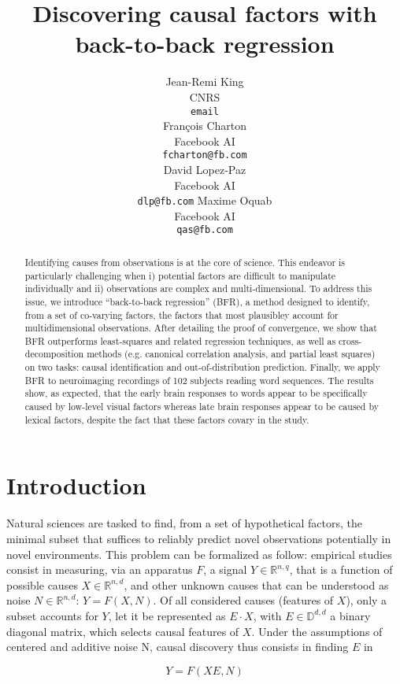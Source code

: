 \documentclass{article}
\title{Discovering causal factors with back-to-back regression}
\author{%
  Jean-Remi King\\
  CNRS\\
  \texttt{email} \\
  \And
  Fran\c{c}ois Charton\\
  Facebook AI\\
  \texttt{fcharton@fb.com}\\
  \And
  David Lopez-Paz\\
  Facebook AI\\
  \texttt{dlp@fb.com}
  \And
  Maxime Oquab\\
  Facebook AI\\
  \texttt{qas@fb.com}
}
\begin{document}
\maketitle

\begin{abstract}
Identifying causes from observations is at the core of science. This endeavor
is particularly challenging when i) potential factors are difficult to
manipulate individually and ii) observations are complex and multi-dimensional.
To address this issue, we introduce ``back-to-back regression'' (BFR), a
method designed to identify, from a set of co-varying factors, the factors
that most plausibley account for multidimensional observations. After detailing
the proof of convergence, we show that BFR outperforms least-squares and related
regression techniques, as well as cross-decomposition methods (e.g. canonical
correlation analysis, and partial least squares) on two tasks: causal
identification and out-of-distribution prediction. Finally, we apply BFR to
neuroimaging recordings of 102 subjects reading word sequences. The results
show, as expected, that the early brain responses to words appear to be
specifically caused by low-level visual factors whereas late brain responses
appear to be caused by lexical factors, despite the fact that these factors
covary in the study.
\end{abstract}

\section{Introduction}

Natural sciences are tasked to find, from a set of hypothetical factors, the minimal subset that suffices to reliably predict novel observations potentially in novel environments.
%
This problem can be formalized as follow: empirical studies consist in measuring, via an apparatus $F$, a signal $Y \in \mathbb{R}^{n, q}$, that is a function of possible causes $X \in \mathbb{R}^{n, d}$, and other unknown causes that can be understood as noise $N \in \mathbb{R}^{n, d}$: $Y=F(X,N)$. Of all considered causes (features of $X$), only a subset accounts for $Y$, let it be represented as $E \cdot X$, with $E \in \mathbb{D}^{d, d}$ a binary diagonal matrix, which selects causal features of $X$.
%
Under the assumptions of centered and additive noise N, causal discovery thus consists in finding $E$ in

\begin{equation}
    Y=F(XE, N)
\end{equation}
\end{document}
